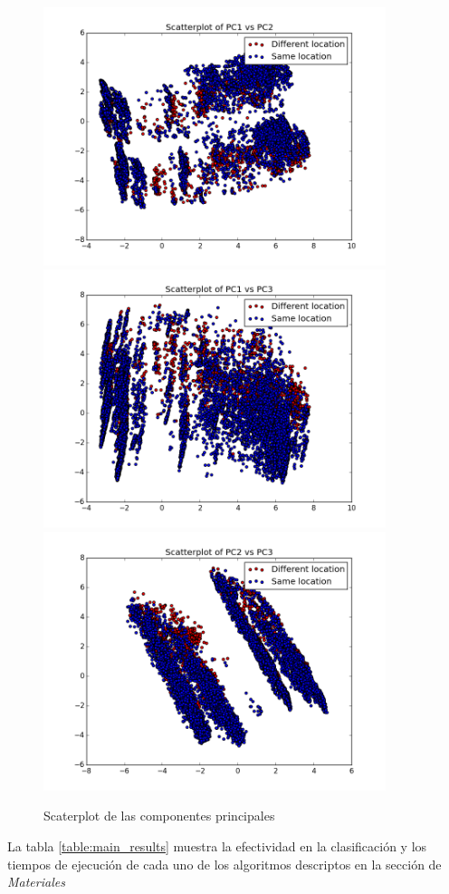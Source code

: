 \documentclass[journal]{IEEEtran}
\begin{document}
\begin{figure}[!ht]
\label{fig:pca_scatterplot}
\caption{Scaterplot de las componentes principales}
\centering
\includegraphics[width=10cm,keepaspectratio]{pca1_vs_pca2.png}
\includegraphics[width=10cm,keepaspectratio]{pca1_vs_pca3.png}
\includegraphics[width=10cm,keepaspectratio]{pca2_vs_pca3.png}
\end{figure}


La tabla \ref{table:main_results} muestra la efectividad en la clasificación
y los tiempos de ejecución de cada uno de los algoritmos descriptos en
la sección de \textit{Materiales}
\end{document}
